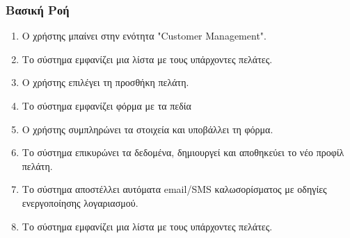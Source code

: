 \documentclass[12pt,a4paper,twoside]{book}
\begin{document}
\subsubsection{Βασική Ροή}
\begin{enumerate}
  \item Ο χρήστης μπαίνει στην ενότητα "Customer Management". %
  \item Το σύστημα εμφανίζει μια λίστα με τους υπάρχοντες πελάτες.
  \item Ο χρήστης επιλέγει τη προσθήκη πελάτη.
  \item Το σύστημα εμφανίζει φόρμα με τα πεδία %
  \item Ο χρήστης συμπληρώνει τα στοιχεία και υποβάλλει τη φόρμα.
  \item Το σύστημα επικυρώνει τα δεδομένα, δημιουργεί και αποθηκεύει το νέο προφίλ πελάτη. %
  \item Το σύστημα αποστέλλει αυτόματα email/SMS καλωσορίσματος με οδηγίες ενεργοποίησης λογαριασμού. %
  \item Το σύστημα εμφανίζει μια λίστα με τους υπάρχοντες πελάτες.
\end{enumerate}
\end{document}
